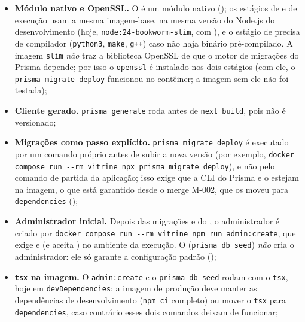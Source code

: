 \begin{itemize}
  \item \textbf{Módulo nativo e OpenSSL.} O  é um módulo nativo (); os estágios de  e de execução usam a mesma imagem-base, na mesma versão do Node.js do desenvolvimento (hoje, \texttt{node:24-bookworm-slim}, com ), e o estágio de  precisa de compilador (\texttt{python3}, \texttt{make}, \texttt{g++}) caso não haja binário pré-compilado. A imagem \texttt{slim} \emph{não} traz a biblioteca OpenSSL de que o motor de migrações do Prisma depende; por isso o \texttt{openssl} é instalado nos dois estágios (com ele, o \texttt{prisma migrate deploy} funcionou no contêiner; a imagem sem ele não foi testada);
  \item \textbf{Cliente gerado.} \texttt{prisma generate} roda antes de \texttt{next build}, pois  não é versionado;
  \item \textbf{Migrações como passo explícito.} \texttt{prisma migrate deploy} é executado por um comando próprio antes de subir a nova versão (por exemplo, \texttt{docker compose run -{}-rm vitrine npx prisma migrate deploy}), e não pelo comando de partida da aplicação; isso exige que a CLI do Prisma e o  estejam na imagem, o que está garantido desde o merge M-002, que os moveu para \texttt{dependencies} ();
  \item \textbf{Administrador inicial.} Depois das migrações e do , o administrador é criado por \texttt{docker compose run -{}-rm vitrine npm run admin:create}, que exige  e  (e aceita ) no ambiente da execução. O  (\texttt{prisma db seed}) \emph{não} cria o administrador: ele só garante a configuração padrão ();
  \item \textbf{\texttt{tsx} na imagem.} O \texttt{admin:create} e o \texttt{prisma db seed} rodam com o \texttt{tsx}, hoje em \texttt{devDependencies}; a imagem de produção deve manter as dependências de desenvolvimento (\texttt{npm ci} completo) ou mover o \texttt{tsx} para \texttt{dependencies}, caso contrário esses dois comandos deixam de funcionar;

\end{itemize}
